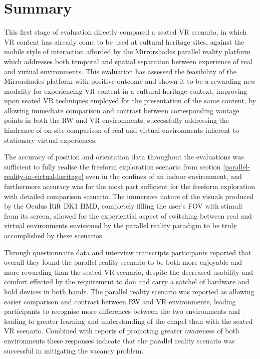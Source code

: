 
\section{Summary}

This first stage of evaluation directly compared a seated VR scenario, in which VR content has already come to be used at cultural heritage sites, against the mobile style of interaction afforded by the Mirrorshades parallel reality platform which addresses both temporal and spatial separation between experience of real and virtual environments. This evaluation has assessed the feasibility of the Mirrorshades platform with positive outcome and shown it to be a rewarding new modality for experiencing VR content in a cultural heritage context, improving upon seated VR techniques employed for the presentation of the same content, by allowing immediate comparison and contrast between corresponding vantage points in both the RW and VR environments, successfully addressing the hindrance of on-site comparison of real and virtual environments inherent to stationary virtual experiences.

The accuracy of position and orientation data throughout the evaluations was sufficient to fully realise the freeform exploration scenario from section \ref{parallel-reality-in-virtual-heritage} even in the confines of an indoor environment, and furthermore accuracy was for the most part sufficient for the freeform exploration with detailed comparison scenario. The immersive nature of the visuals produced by the Oculus Rift DK1 HMD, completely filling the user's FOV with stimuli from its screen, allowed for the experiential aspect of switching between real and virtual environments envisioned by the parallel reality paradigm to be truly accomplished by these scenarios.

Through questionnaire data and interview transcripts participants reported that overall they found the parallel reality scenario to be both more enjoyable and more rewarding than the seated VR scenario, despite the decreased usability and comfort effected by the requirement to don and carry a satchel of hardware and hold devices in both hands. The parallel reality scenario was reported as allowing easier comparison and contrast between RW and VR environments, leading participants to recognise more differences between the two environments and leading to greater learning and understanding of the chapel than with the seated VR scenario. Combined with reports of promoting greater awareness of both environments these responses indicate that the parallel reality scenario was successful in mitigating the vacancy problem.

